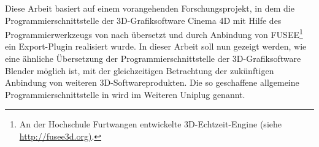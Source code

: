  \label{sec:Frage}

Diese Arbeit basiert auf einem vorangehenden Forschungsprojekt, in dem die Programmierschnittstelle der 3D-Grafiksoftware Cinema 4D mit Hilfe des Programmierwerkzeugs  von \CC nach \CS übersetzt und durch Anbindung von FUSEE\footnote{An der Hochschule Furtwangen entwickelte 3D-Echtzeit-Engine (siehe \url{http://fusee3d.org)}.} ein Export-Plugin realisiert wurde.
In dieser Arbeit soll nun gezeigt werden, wie eine ähnliche Übersetzung der Programmierschnittstelle der 3D-Grafiksoftware Blender möglich ist, mit der gleichzeitigen Betrachtung der zukünftigen Anbindung von weiteren 3D-Softwareprodukten. Die so geschaffene allgemeine Programmierschnittstelle in \CS wird im Weiteren Uniplug genannt.


